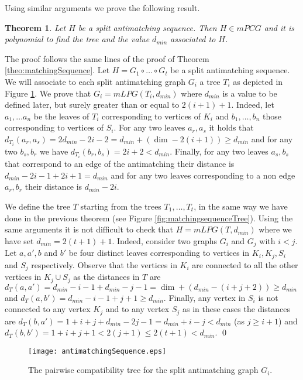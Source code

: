 \documentclass[dvipdfm]{llncs}
\newtheorem{Theorem}{Theorem}
\newcommand{\dmin}{d_{min}}
\begin{document}
\noindent
Using similar arguments we prove the following result.


\begin{Theorem}\label{theo:antimatchingSequence}
Let $H$ be a split antimatching sequence. Then  $H \in mPCG$ and it is polynomial to find the tree and the value $\dmin$ associated to $H$.
\end{Theorem}
\proof

The proof follows the same lines of the proof of Theorem \ref{theo:matchingSequence}. Let $H= G_1 \circ \ldots \circ G_t$ be a  split antimatching sequence. We will associate to each split antimatching graph $G_i$ a tree $T_i$ as depicted in Figure \ref{fig:antimatchingsequence}. 
We prove that $G_i=mLPG(T_i, \dmin)$ where $\dmin$ is a value to be defined later, but surely greater than or equal to $2(i+1)+1$. Indeed, let $a_1, \ldots a_n$ be the leaves of $T_i$ corresponding to vertices of $K_i$ and $b_1, \ldots, b_n$ those corresponding to vertices of $S_i$. For any two leaves $a_r, a_s$ it holds that $d_{T_i}(a_r,a_s)=2 \dmin -2i-2= \dmin + (\dim -2(i+1)) \geq \dmin$ and for any two $b_s, b_r$ we have $d_{T_i}(b_r,b_s)=2i+2 < \dmin$. Finally, for any two leaves $a_s, b_s$ that correspond to an edge of the antimatching their distance is $\dmin-2i-1+2i+1=\dmin$ and for any two leaves corresponding to a non edge $a_r, b_r$ their distance is $\dmin-2i$. 

We define the tree $T$ starting from the trees $T_1, \ldots, T_t$, in the same way we have done in the previous theorem (see Figure \ref{fig:matchingsequenceTree}). Using the same arguments it is not difficult to check that $H=mLPG(T, \dmin)$ where we have set $\dmin = 2(t+1)+1$. 
Indeed, consider two graphs $G_i$ and $G_j$ with $i < j$. Let  $a, a', b$ and $b'$ be four distinct leaves  corresponding to vertices in $K_i, K_j, S_i$ and $S_j$ respectively. 
Observe that the vertices in $K_i$ are connected to all the other vertices in $K_j \cup S_j$ as the distances in $T$ are 
$d_T(a,a') = \dmin-i-1+\dmin-j-1= \dim + (\dmin- (i+j+2)) \geq \dmin$ and $d_T(a,b') = \dmin-i-1+j+1\geq \dmin$. Finally, any vertex in $S_i$ is not connected to any vertex $K_j$ and to any vertex $S_j$ as in these cases the distances are $d_T(b,a') = 1+i+j+\dmin-2j-1=\dmin+i-j < \dmin$ (as $j \geq i+1$) and $d_T(b,b') =1+i+j+1 < 2(j+1) \leq 2(t+1) < \dmin$. \qed

\begin{figure}[!ht]
  \begin{center}
\texttt{[image: antimatchingSequence.eps]}
  \end{center}
\caption{\footnotesize{The pairwise compatibility tree for the split antimatching graph $G_i$. }}
\label{fig:antimatchingsequence}
\end{figure}
\end{document}
